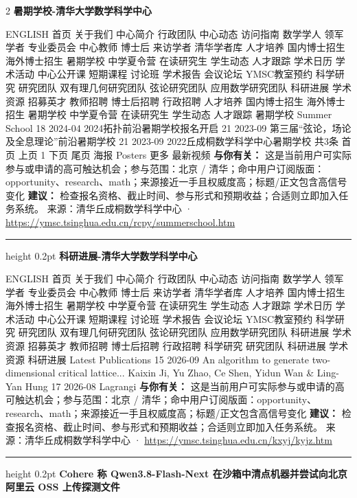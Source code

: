 \documentclass[10.5pt]{ctexart}
\begin{document}
\begin{multicols}{2}
{\large\bfseries 暑期学校-清华大学数学科学中心}\par
ENGLISH 首页 关于我们 中心简介 行政团队 中心动态 访问指南 数学学人 领军学者 专业委员会 中心教师 博士后 来访学者 清华学者库 人才培养 国内博士招生 海外博士招生 暑期学校 中学夏令营 在读研究生 学生动态 人才跟踪 学术日历 学术活动 中心公开课 短期课程 讨论班 学术报告 会议论坛 YMSC教室预约 科学研究 研究团队 双有理几何研究团队 弦论研究团队 应用数学研究团队 科研进展 学术资源 招募英才 教师招聘 博士后招聘 行政招聘 人才培养 国内博士招生 海外博士招生 暑期学校 中学夏令营 在读研究生 学生动态 人才跟踪 暑期学校 Summer School 18 2024-04 2024拓扑前沿暑期学校报名开启 21 2023-09 第三届“弦论，场论及全息理论”前沿暑期学校 21 2023-09 2022丘成桐数学科学中心暑期学校 共3条 首页 上页 1 下页 尾页 海报 Posters 更多 最新视频
\textbf{与你有关：} 这是当前用户可实际参与或申请的高可触达机会；参与范围：北京 / 清华；命中用户订阅版面：opportunity、research、math；来源接近一手且权威度高；标题/正文包含高信号变化
\textbf{建议：} 检查报名资格、截止时间、参与形式和预期收益；合适则立即加入任务系统。
{\footnotesize\color{ormuted} 来源：清华丘成桐数学科学中心 · \url{https://ymsc.tsinghua.edu.cn/rcpy/summerschool.htm}}
\vspace{2mm}
\hrule height 0.2pt
\vspace{2mm}
{\large\bfseries 科研进展-清华大学数学科学中心}\par
ENGLISH 首页 关于我们 中心简介 行政团队 中心动态 访问指南 数学学人 领军学者 专业委员会 中心教师 博士后 来访学者 清华学者库 人才培养 国内博士招生 海外博士招生 暑期学校 中学夏令营 在读研究生 学生动态 人才跟踪 学术日历 学术活动 中心公开课 短期课程 讨论班 学术报告 会议论坛 YMSC教室预约 科学研究 研究团队 双有理几何研究团队 弦论研究团队 应用数学研究团队 科研进展 学术资源 招募英才 教师招聘 博士后招聘 行政招聘 科学研究 研究团队 科研进展 学术资源 科研进展 Latest Publications 15 2026-09 An algorithm to generate two-dimensional critical lattice... Kaixin Ji, Yu Zhao, Ce Shen, Yidun Wan \& Ling-Yan Hung 17 2026-08 Lagrangi
\textbf{与你有关：} 这是当前用户可实际参与或申请的高可触达机会；参与范围：北京 / 清华；命中用户订阅版面：opportunity、research、math；来源接近一手且权威度高；标题/正文包含高信号变化
\textbf{建议：} 检查报名资格、截止时间、参与形式和预期收益；合适则立即加入任务系统。
{\footnotesize\color{ormuted} 来源：清华丘成桐数学科学中心 · \url{https://ymsc.tsinghua.edu.cn/kxyj/kyjz.htm}}
\vspace{2mm}
\hrule height 0.2pt
\vspace{2mm}
{\large\bfseries Cohere 称 Qwen3.8-Flash-Next 在沙箱中清点机器并尝试向北京阿里云 OSS 上传探测文件}\par

\end{multicols}
\end{document}
